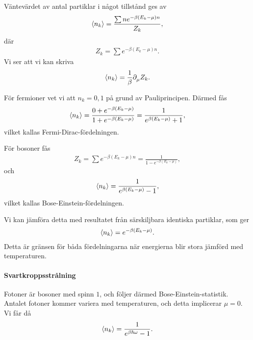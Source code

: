 Väntevärdet av antal partiklar i något tillstånd ges av
\begin{align*}
	\expval{n_{k}} = \frac{\sum ne^{-\beta(E_{k} - \mu)n}}{Z_{k}},
\end{align*}
där
\begin{align*}
	Z_{k} = \sum e^{-\beta(E_{k} - \mu)n}.
\end{align*}
Vi ser att vi kan skriva
\begin{align*}
	\expval{n_{k}} = \frac{1}{\beta}\partial_{\mu}^{}Z_{k}.
\end{align*}

För fermioner vet vi att $n_{k} = 0, 1$ på grund av Pauliprincipen. Därmed fås
\begin{align*}
	\expval{n_{k}} = \frac{0 + e^{-\beta(E_{k} - \mu)}}{1 + e^{-\beta(E_{k} - \mu)}} = \frac{1}{e^{\beta(E_{k} - \mu)} + 1},
\end{align*}
vilket kallas Fermi-Dirac-fördelningen.

För bosoner fås
\begin{align*}
	Z_{k} = \sum e^{-\beta(E_{k} - \mu)n} = \frac{1}{1 - e^{-\beta(E_{k} - \mu)}},
\end{align*}
och
\begin{align*}
	\expval{n_{k}} = \frac{1}{e^{\beta(E_{k} - \mu)} - 1},
\end{align*}
vilket kallas Bose-Einstein-fördelningen.

Vi kan jämföra detta med resultatet från särskiljbara identiska partiklar, som ger
\begin{align*}
	\expval{n_{k}} = e^{-\beta(E_{k} - \mu)}.
\end{align*}
Detta är gränsen för båda fördelningarna när energierna blir stora jämförd med temperaturen.

\paragraph{Svartkroppsstrålning}
Fotoner är bosoner med spinn $1$, och följer därmed Bose-Einstein-statistik. Antalet fotoner kommer variera med temperaturen, och detta implicerar $\mu = 0$. Vi får då
\begin{align*}
	\expval{n_{k}} = \frac{1}{e^{\beta\hbar\omega} - 1}.
\end{align*}